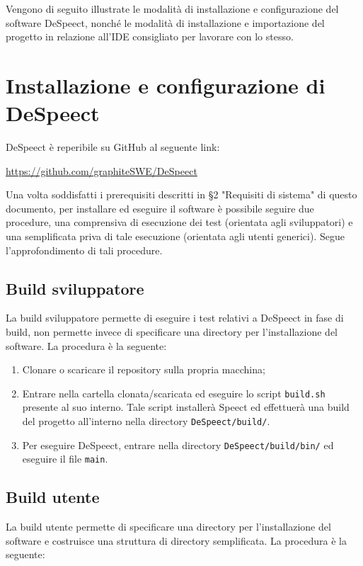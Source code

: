 \documentclass[openany,12pt,a4paper]{report}
\begin{document}
	Vengono di seguito illustrate le modalità di installazione e configurazione del software DeSpeect, nonché le modalità di installazione e importazione del progetto in relazione all'IDE consigliato per lavorare con lo stesso.
	
	\section{Installazione e configurazione di DeSpeect}
	
	DeSpeect è reperibile su GitHub al seguente link:
	\begin{center}
		\url{https://github.com/graphiteSWE/DeSpeect}
	\end{center}
	
	\noindent Una volta soddisfatti i prerequisiti descritti in §2 "Requisiti di sistema" di questo documento, per installare ed eseguire il software è possibile seguire due procedure, una comprensiva di esecuzione dei test (orientata agli sviluppatori) e una semplificata priva di tale esecuzione (orientata agli utenti generici). Segue l'approfondimento di tali procedure.
	
	\subsection{Build sviluppatore}
	
	La build sviluppatore permette di eseguire i test relativi a DeSpeect in fase di build, non permette invece di specificare una directory per l'installazione del software. La procedura è la seguente:
	
	\begin{enumerate}
		\item Clonare o scaricare il repository sulla propria macchina;
		\item Entrare nella cartella clonata/scaricata ed eseguire lo script \verb|build.sh| presente al suo interno. Tale script installerà Speect ed effettuerà una build del progetto all'interno nella directory \verb|DeSpeect/build/|.
		\item Per eseguire DeSpeect, entrare nella directory \verb|DeSpeect/build/bin/| ed eseguire il file \verb|main|.
	\end{enumerate}

	\subsection{Build utente}
	
	La build utente permette di specificare una directory per l'installazione del software e costruisce una struttura di directory semplificata. La procedura è la seguente:
	
\end{document}
